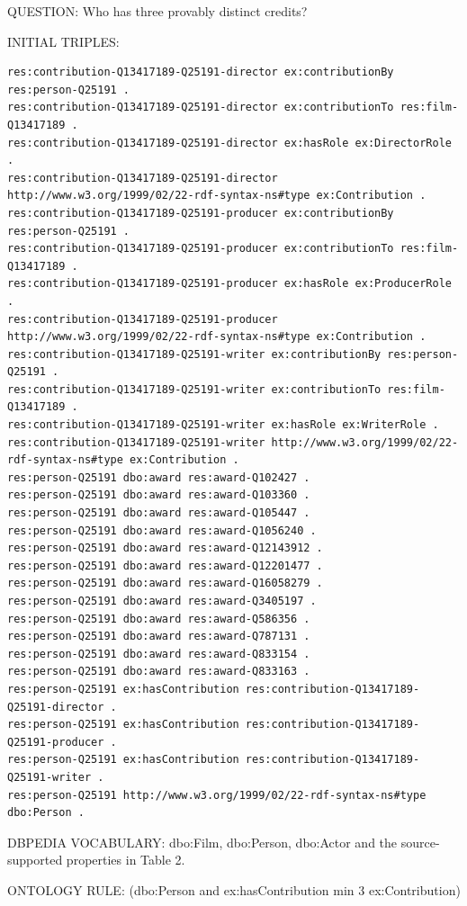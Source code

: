 \documentclass[
  11pt,
]{article}
\begin{document}
QUESTION: Who has three provably distinct credits?

INITIAL TRIPLES:

\begin{verbatim}
res:contribution-Q13417189-Q25191-director ex:contributionBy res:person-Q25191 .
res:contribution-Q13417189-Q25191-director ex:contributionTo res:film-Q13417189 .
res:contribution-Q13417189-Q25191-director ex:hasRole ex:DirectorRole .
res:contribution-Q13417189-Q25191-director http://www.w3.org/1999/02/22-rdf-syntax-ns#type ex:Contribution .
res:contribution-Q13417189-Q25191-producer ex:contributionBy res:person-Q25191 .
res:contribution-Q13417189-Q25191-producer ex:contributionTo res:film-Q13417189 .
res:contribution-Q13417189-Q25191-producer ex:hasRole ex:ProducerRole .
res:contribution-Q13417189-Q25191-producer http://www.w3.org/1999/02/22-rdf-syntax-ns#type ex:Contribution .
res:contribution-Q13417189-Q25191-writer ex:contributionBy res:person-Q25191 .
res:contribution-Q13417189-Q25191-writer ex:contributionTo res:film-Q13417189 .
res:contribution-Q13417189-Q25191-writer ex:hasRole ex:WriterRole .
res:contribution-Q13417189-Q25191-writer http://www.w3.org/1999/02/22-rdf-syntax-ns#type ex:Contribution .
res:person-Q25191 dbo:award res:award-Q102427 .
res:person-Q25191 dbo:award res:award-Q103360 .
res:person-Q25191 dbo:award res:award-Q105447 .
res:person-Q25191 dbo:award res:award-Q1056240 .
res:person-Q25191 dbo:award res:award-Q12143912 .
res:person-Q25191 dbo:award res:award-Q12201477 .
res:person-Q25191 dbo:award res:award-Q16058279 .
res:person-Q25191 dbo:award res:award-Q3405197 .
res:person-Q25191 dbo:award res:award-Q586356 .
res:person-Q25191 dbo:award res:award-Q787131 .
res:person-Q25191 dbo:award res:award-Q833154 .
res:person-Q25191 dbo:award res:award-Q833163 .
res:person-Q25191 ex:hasContribution res:contribution-Q13417189-Q25191-director .
res:person-Q25191 ex:hasContribution res:contribution-Q13417189-Q25191-producer .
res:person-Q25191 ex:hasContribution res:contribution-Q13417189-Q25191-writer .
res:person-Q25191 http://www.w3.org/1999/02/22-rdf-syntax-ns#type dbo:Person .
\end{verbatim}

DBPEDIA VOCABULARY: dbo:Film, dbo:Person, dbo:Actor and the
source-\allowbreak{}s\allowbreak{}upported\allowbreak{} properties in
Table 2.

ONTOLOGY RULE: (dbo:Person and
ex:\allowbreak{}has\allowbreak{}Co\allowbreak{}ntributi\allowbreak{}on
min 3
ex:\allowbreak{}\allowbreak{}Contr\allowbreak{}ibution)\allowbreak{}
\end{document}
